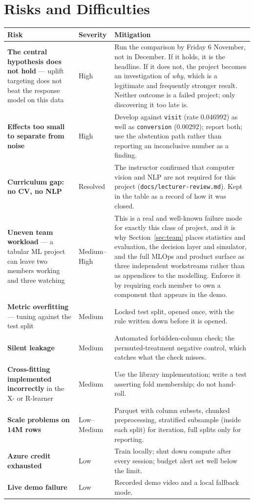 \documentclass[11pt,a4paper]{article}
\begin{document}
\section{Risks and Difficulties}
\label{sec:risks}

\begin{longtable}{@{}L{4.2cm}L{1.8cm}L{8.0cm}@{}}
\toprule
\textbf{Risk} & \textbf{Severity} & \textbf{Mitigation} \\
\midrule
\endhead
\textbf{The central hypothesis does not hold} --- uplift targeting does not beat the response model
on this data & High & Run the comparison by Friday 6 November, not in December. If it holds, it is the headline.
If it does not, the project becomes an investigation of \emph{why}, which is a legitimate and
frequently stronger result. Neither outcome is a failed project; only discovering it too late is. \\
\addlinespace
\textbf{Effects too small to separate from noise} & High & Develop against \texttt{visit}
(rate 0.046992) as well as \texttt{conversion} (0.00292); report both; use the abstention path
rather than reporting an inconclusive number as a finding. \\
\addlinespace
\textbf{Curriculum gap: no CV, no NLP} & Resolved & The instructor confirmed that computer vision
and NLP are not required for this project (\texttt{docs/lecturer-review.md}). Kept in the table as
a record of how it was closed. \\
\addlinespace
\textbf{Uneven team workload} --- a tabular ML project can leave two members working and three
watching & Medium--High & This is a real and well-known failure mode for exactly this class of
project, and it is why Section~\ref{sec:team} places statistics and evaluation, the decision layer
and simulator, and the full MLOps and product surface as three independent workstreams rather than
as appendices to the modelling. Enforce it by requiring each member to own a component that appears
in the demo. \\
\addlinespace
\textbf{Metric overfitting} --- tuning against the test split & Medium & Locked test split, opened
once, with the rule written down before it is opened. \\
\addlinespace
\textbf{Silent leakage} & Medium & Automated forbidden-column check; the permuted-treatment negative
control, which catches what the check misses. \\
\addlinespace
\textbf{Cross-fitting implemented incorrectly} in the X- or R-learner & Medium & Use the library
implementation; write a test asserting fold membership; do not hand-roll. \\
\addlinespace
\textbf{Scale problems on 14M rows} & Low--Medium & Parquet with column subsets, chunked
preprocessing, stratified subsample (inside each split) for iteration, full splits only for
reporting. \\
\addlinespace
\textbf{Azure credit exhausted} & Low & Train locally; shut down compute after every session; budget
alert set well below the limit. \\
\addlinespace
\textbf{Live demo failure} & Low & Recorded demo video and a local fallback mode. \\
\bottomrule
\end{longtable}
\end{document}
